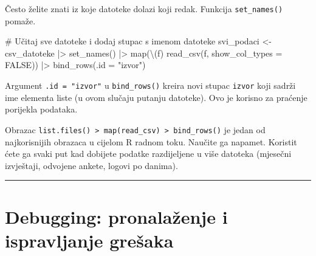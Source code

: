 \documentclass[
  croatian,
  letterpaper,
  DIV=11,
  numbers=noendperiod]{scrartcl}
\newenvironment{Shaded}{\begin{snugshade}}{\end{snugshade}}
\newcommand{\AttributeTok}[1]{\textcolor[rgb]{0.40,0.45,0.13}{#1}}
\newcommand{\CommentTok}[1]{\textcolor[rgb]{0.37,0.37,0.37}{#1}}
\newcommand{\ConstantTok}[1]{\textcolor[rgb]{0.56,0.35,0.01}{#1}}
\newcommand{\FunctionTok}[1]{\textcolor[rgb]{0.28,0.35,0.67}{#1}}
\newcommand{\NormalTok}[1]{\textcolor[rgb]{0.00,0.23,0.31}{#1}}
\newcommand{\OtherTok}[1]{\textcolor[rgb]{0.00,0.23,0.31}{#1}}
\newcommand{\SpecialCharTok}[1]{\textcolor[rgb]{0.37,0.37,0.37}{#1}}
\newcommand{\StringTok}[1]{\textcolor[rgb]{0.13,0.47,0.30}{#1}}
\begin{document}
Često želite znati iz koje datoteke dolazi koji redak. Funkcija
\texttt{set\_names()} pomaže.

\begin{Shaded}
\begin{Highlighting}[]
\CommentTok{\# Učitaj sve datoteke i dodaj stupac s imenom datoteke}
\NormalTok{svi\_podaci }\OtherTok{\textless{}{-}}\NormalTok{ csv\_datoteke }\SpecialCharTok{|\textgreater{}}
  \FunctionTok{set\_names}\NormalTok{() }\SpecialCharTok{|\textgreater{}}
  \FunctionTok{map}\NormalTok{(\textbackslash{}(f) }\FunctionTok{read\_csv}\NormalTok{(f, }\AttributeTok{show\_col\_types =} \ConstantTok{FALSE}\NormalTok{)) }\SpecialCharTok{|\textgreater{}}
  \FunctionTok{bind\_rows}\NormalTok{(}\AttributeTok{.id =} \StringTok{"izvor"}\NormalTok{)}
\end{Highlighting}
\end{Shaded}

Argument \texttt{.id\ =\ "izvor"} u \texttt{bind\_rows()} kreira novi
stupac \texttt{izvor} koji sadrži ime elementa liste (u ovom slučaju
putanju datoteke). Ovo je korisno za praćenje porijekla podataka.

\begin{tcolorbox}[enhanced jigsaw, coltitle=black, arc=.35mm, colframe=quarto-callout-tip-color-frame, left=2mm, bottomrule=.15mm, toprule=.15mm, leftrule=.75mm, bottomtitle=1mm, colback=white, title=\textcolor{quarto-callout-tip-color}{\faLightbulb}\hspace{0.5em}{Praktični savjet}, opacityback=0, colbacktitle=quarto-callout-tip-color!10!white, toptitle=1mm, titlerule=0mm, opacitybacktitle=0.6, breakable, rightrule=.15mm]

Obrazac
\texttt{list.files()\ \textbar{}\textgreater{}\ map(read\_csv)\ \textbar{}\textgreater{}\ bind\_rows()}
je jedan od najkorisnijih obrazaca u cijelom R radnom toku. Naučite ga
napamet. Koristit ćete ga svaki put kad dobijete podatke razdijeljene u
više datoteka (mjesečni izvještaji, odvojene ankete, logovi po danima).

\end{tcolorbox}

\begin{center}\rule{0.5\linewidth}{0.5pt}\end{center}

\section{Debugging: pronalaženje i ispravljanje
grešaka}\label{sec-debugging}
\end{document}
